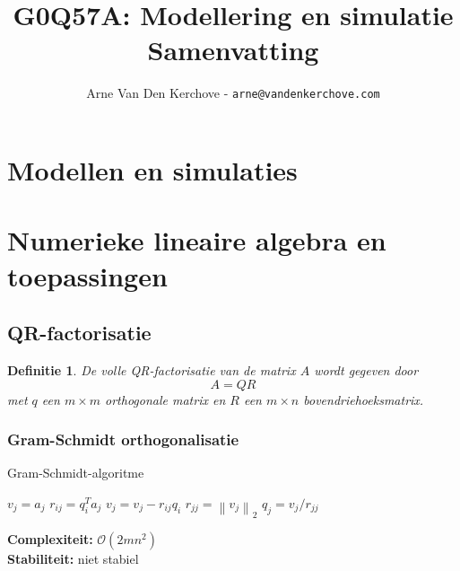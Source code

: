 \documentclass{article}
\title{
	G0Q57A: Modellering en simulatie\\
	Samenvatting
}
\author{Arne Van Den Kerchove - \texttt{arne@vandenkerchove.com}}
\newtheorem{mydef}{Definitie}
\newcommand{\norm}[1]{\left\lVert#1\right\rVert}
\begin{document}
	\maketitle
	
	\pagebreak
	
	\tableofcontents
	
	\pagebreak	
	
	
	\section{Modellen en simulaties}
	
	
	\section{Numerieke lineaire algebra en toepassingen}
	
	\subsection{QR-factorisatie}
	
	
	\begin{mydef}
		De volle QR-factorisatie van de matrix $A$ wordt gegeven door
		$$	A=QR  $$
		met $q$ een $m \times m$ orthogonale matrix en $R$ een $m \times n $ bovendriehoeksmatrix.
	\end{mydef}

	\subsubsection{Gram-Schmidt orthogonalisatie}
	

	\begin{algorithm}[!ht]
		\caption{Gram-Schmidt-algoritme}
		\begin{algorithmic}[1]
					\State $v_j = a_j$
						\State $r_{ij} = q_i^T a_j$
						\State $v_j = v_j - r_{ij} q_i$
					\EndFor
					\State $r_{jj} = \norm{v_j}_2$
					\State $q_j = v_j/r_{jj}$
				\EndFor 
			\EndProcedure
		\end{algorithmic}
	\end{algorithm}

	\textbf{Complexiteit:} $\mathcal{O}(2mn^2)$\\
	\textbf{Stabiliteit:} niet stabiel
	
\end{document}
